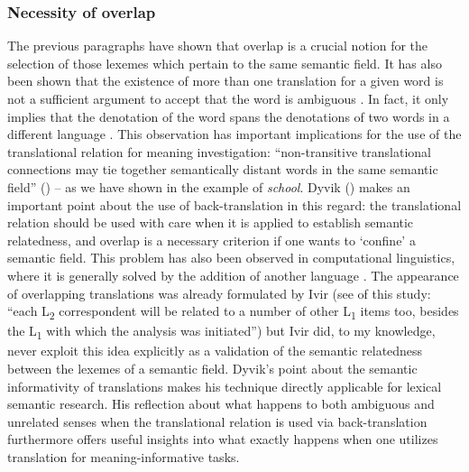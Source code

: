 \subsubsection{Necessity of overlap}
\label{sec:3.4.3.5}
The previous paragraphs have shown that overlap is a crucial notion for the selection of those lexemes which pertain to the same semantic field. It has also been shown that the existence of more than one translation for a given word is not a sufficient argument to accept that the word is ambiguous \citep[30]{langemets_translations_2005}. In fact, it only implies that the denotation of the word spans the denotations of two words in a different language \citep[29]{langemets_translations_2005}. This observation has important implications for the use of the translational relation for meaning investigation: “non-transitive translational connections may tie together semantically distant words in the same semantic field” (\citealt[29]{langemets_translations_2005}) – as we have shown in the example of \textit{school}. Dyvik (\citealt[29]{langemets_translations_2005}) makes an important point about the use of back-translation in this regard: the translational relation should be used with care when it is applied to establish semantic relatedness, and overlap is a necessary criterion if one wants to ‘confine’ a semantic field. This problem has also been observed in computational linguistics, where it is generally solved by the addition of another language \citep{gelbukh_five_2013}. The appearance of overlapping translations was already formulated by Ivir (see  of this study: “each L\textsubscript{2} correspondent will be related to a number of other L\textsubscript{1} items too, besides the L\textsubscript{1} with which the analysis was initiated”) but Ivir did, to my knowledge, never exploit this idea explicitly as a validation of the semantic relatedness between the lexemes of a semantic field. Dyvik’s point about the semantic informativity of translations makes his technique directly applicable for lexical semantic research. His reflection about what happens to both ambiguous and unrelated senses when the translational relation is used via back-translation furthermore offers useful insights into what exactly happens when one utilizes translation for meaning-informative tasks.

